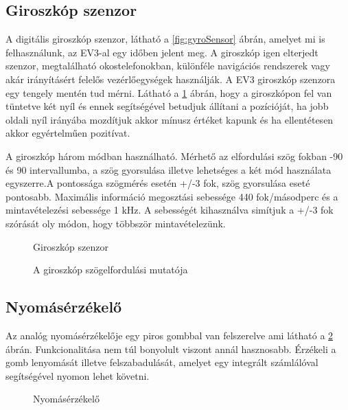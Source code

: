 \subsection{Giroszkóp szenzor}

A digitális giroszkóp szenzor, látható a \ref{fig:gyroSensor} ábrán, amelyet mi is felhasználunk, az EV3-al egy időben jelent meg. A giroszkóp igen elterjedt szenzor, megtalálható okostelefonokban, különféle navigációs rendszerek vagy akár irányításért felelős vezérlőegységek használják. A EV3 giroszkóp szenzora egy tengely mentén tud mérni. Látható a \ref{fig:gyroFok} ábrán, hogy a giroszkópon fel van tüntetve két nyíl és ennek segítségével betudjuk állítani a pozícióját, ha jobb oldali nyíl irányába mozdítjuk akkor mínusz értéket kapunk és ha ellentétesen akkor egyértelműen pozitívat. 

A giroszkóp három módban használható. Mérhető az elfordulási szög fokban -90 és 90 intervallumba, a szög gyorsulása illetve lehetséges a két mód használata egyszerre.A pontossága szögmérés esetén +/-3 fok, szög gyorsulása eseté pontosabb. Maximális információ megosztási sebessége 440 fok/másodperc és a mintavételezési sebessége 1 kHz. A sebességét kihasználva simítjuk  a +/-3 fok szórását oly módon, hogy többször mintavételezünk.

\begin{figure}[!htb]
	\centering
	\label{fig:gyroSensor}
	\caption{Giroszkóp szenzor}
	\endminipage
	\label{fig:gyroFok}
	\caption{A giroszkóp szögelfordulási mutatója}
	\endminipage
\end{figure}

\subsection{Nyomásérzékelő}
Az analóg nyomásérzékelője egy piros gombbal van felszerelve ami látható a \ref{fig:touchSensor} ábrán. Funkcionalitása nem túl bonyolult viszont annál hasznosabb. Érzékeli a gomb lenyomását illetve felszabadulását, amelyet egy integrált számlálóval segítségével nyomon lehet követni. 

\begin{figure}[!htb]
	\label{fig:touchSensor}
	\centering
	\caption{Nyomásérzékelő}
\end{figure}

